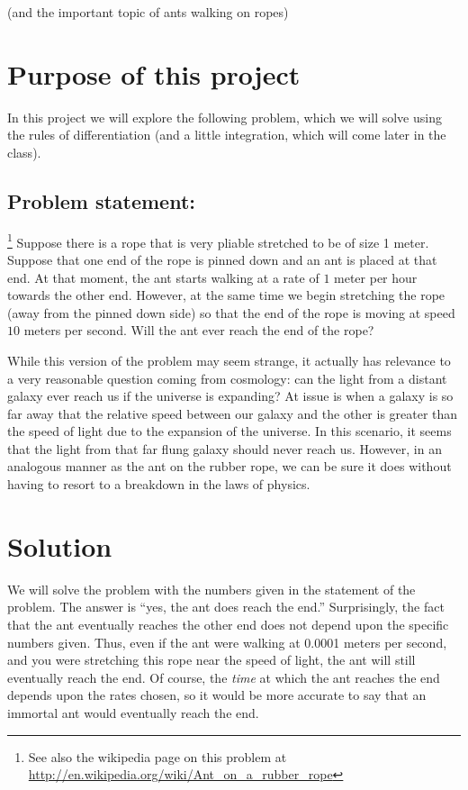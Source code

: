 
\centerline{(and the important topic of ants walking on
ropes)}

\section*{Purpose of this project}

In this project we will explore the following problem, which we will
solve using the rules of differentiation (and a little integration,
which will come later in the class).

\medskip

\subsection*{Problem statement:}\footnote{See also the wikipedia
  page on this problem at
  \url{http://en.wikipedia.org/wiki/Ant_on_a_rubber_rope}} Suppose
there is a rope that is very pliable stretched to be of size 1 meter.
Suppose that one end of the rope is pinned down and an ant is placed
at that end.  At that moment, the ant starts walking at a rate of $1$
meter per hour towards the other end.  However, at the same time we
begin stretching the rope (away from the pinned down side) so that the
end of the rope is moving at speed $10$ meters per second.  Will the
ant ever reach the end of the rope?

\medskip

While this version of the problem may seem strange, it actually has
relevance to a very reasonable question coming from cosmology: can the
light from a distant galaxy ever reach us if the universe is
expanding?  At issue is when a galaxy is so far away that the relative
speed between our galaxy and the other is greater than the speed of
light due to the expansion of the universe.  In this scenario, it
seems that the light from that far flung galaxy should never reach us.
However, in an analogous manner as the ant on the rubber rope, we can
be sure it does without having to resort to a breakdown in the laws of
physics.

\section{Solution}

We will solve the problem with the numbers given in the statement of
the problem.  The answer is ``yes, the ant does reach the end.''
Surprisingly, the fact that the ant eventually reaches the other end
does not depend upon the specific numbers given.  Thus, even if the
ant were walking at 0.0001 meters per second, and you were stretching
this rope near the speed of light, the ant will still eventually reach
the end.  Of course, the \textit{time} at which the ant reaches the
end depends upon the rates chosen, so it would be more accurate to say
that an immortal ant would eventually reach the end.

